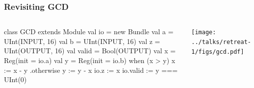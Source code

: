 \documentclass[xcolor=pdflatex,dvipsnames,table]{beamer}
\begin{document}
\begin{frame}[fragile]
\frametitle{Revisiting GCD}
\begin{columns}


\begin{footnotesize}
\begin{scala}
class GCD extends Module {
  val io = new Bundle {
    val a     = UInt(INPUT, 16)
    val b     = UInt(INPUT, 16)
    val z     = UInt(OUTPUT, 16)
    val valid = Bool(OUTPUT) }
  val x = Reg(init = io.a)
  val y = Reg(init = io.b)
  when (x > y) {
    x := x - y
  } .otherwise {
    y := y - x
  }
  io.z     := x
  io.valid := y === UInt(0)
}
\end{scala}
\end{footnotesize}


\begin{center}
\texttt{[image: ../talks/retreat-1/figs/gcd.pdf]} 
\end{center}

\end{columns}
\end{frame}
\end{document}
